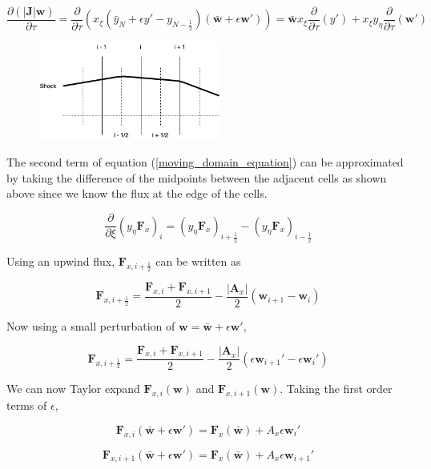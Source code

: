 \documentclass[10pt]{article}
\begin{document}
	\begin{equation} \label{moving_domain_equation_term1}
		\frac{\partial (|\mathbf{J}| \mathbf{w})}{\partial \tau} = \frac{\partial}{\partial \tau} (x_\xi (\bar{y}_N + \epsilon y' - y_{N-\frac{1}{2}}) (\bar{\mathbf{w}} + \epsilon \mathbf{w}')) = \bar{\mathbf{w}} x_\xi \frac{\partial}{\partial \tau}(y') + x_\xi y_\eta \frac{\partial}{\partial \tau} (\mathbf{w}')
	\end{equation}
	
	\begin{figure}[h]
		\includegraphics[width=6cm]{shock_point_x}
		\centering
	\end{figure}
	
	The second term of equation (\ref{moving_domain_equation}) can be approximated by taking the difference of the midpoints between the adjacent cells as shown above since we know the flux at the edge of the cells.
	
	$$ \frac{\partial}{\partial \xi} (y_\eta \mathbf{F}_x)_i =  (y_\eta \mathbf{F}_x)_{i+\frac{1}{2}} - (y_\eta \mathbf{F}_x)_{i-\frac{1}{2}} $$
	
	Using an upwind flux, $\mathbf{F}_{x,i+\frac{1}{2}}$ can be written as
	
	$$ \mathbf{F}_{x,i+\frac{1}{2}} = \frac{\mathbf{F}_{x,i} + \mathbf{F}_{x,i+1}}{2} - \frac{|\mathbf{A}_x|}{2}(\mathbf{w}_{i+1} - \mathbf{w}_{i})$$
	
	Now using a small perturbation of $\mathbf{w} = \bar{\mathbf{w}} + \epsilon \mathbf{w}'$, 
	
	$$ \mathbf{F}_{x,i+\frac{1}{2}} = \frac{\mathbf{F}_{x,i} + \mathbf{F}_{x,i+1}}{2} - \frac{|\mathbf{A}_x|}{2} (\epsilon \mathbf{w}_{i+1}' - \epsilon \mathbf{w}_i')$$
	
	We can now Taylor expand $\mathbf{F}_{x,i}(\mathbf{w})$ and $\mathbf{F}_{x,i+1}(\mathbf{w})$. Taking the first order terms of $\epsilon$,
	
	$$ \mathbf{F}_{x,i}(\bar{\mathbf{w}} + \epsilon \mathbf{w}') = \mathbf{F}_{x}(\bar{\mathbf{w}}) + A_x \epsilon \mathbf{w}_i' $$
	
	$$ \mathbf{F}_{x,i+1}(\bar{\mathbf{w}} + \epsilon \mathbf{w}') = \mathbf{F}_{x}(\bar{\mathbf{w}}) + A_x \epsilon \mathbf{w}_{i+1}' $$
	
\end{document}
